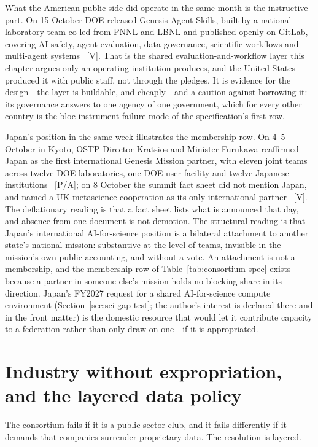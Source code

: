 What the American public side did operate in the same month is the instructive part. On 15 October DOE released Genesis Agent Skills, built by a national-laboratory team co-led from PNNL and LBNL and published openly on GitLab, covering AI safety, agent evaluation, data governance, scientific workflows and multi-agent systems~\cite{sci-genesis-skills} [V]. That is the shared evaluation-and-workflow layer this chapter argues only an operating institution produces, and the United States produced it with public staff, not through the pledges. It is evidence for the design---the layer is buildable, and cheaply---and a caution against borrowing it: its governance answers to one agency of one government, which for every other country is the bloc-instrument failure mode of the specification's first row.

Japan's position in the same week illustrates the membership row. On 4--5 October in Kyoto, OSTP Director Kratsios and Minister Furukawa reaffirmed Japan as the first international Genesis Mission partner, with eleven joint teams across twelve DOE laboratories, one DOE user facility and twelve Japanese institutions~\cite{gov-japan-us-kyoto} [P/A]; on 8 October the summit fact sheet did not mention Japan, and named a UK metascience cooperation as its only international partner~\cite{sci-wh-summit} [V]. The deflationary reading is that a fact sheet lists what is announced that day, and absence from one document is not demotion. The structural reading is that Japan's international AI-for-science position is a bilateral attachment to another state's national mission: substantive at the level of teams, invisible in the mission's own public accounting, and without a vote. An attachment is not a membership, and the membership row of Table~\ref{tab:consortium-spec} exists because a partner in someone else's mission holds no blocking share in its direction. Japan's FY2027 request for a shared AI-for-science compute environment (Section~\ref{sec:sci-gap-test}; the author's interest is declared there and in the front matter) is the domestic resource that would let it contribute capacity to a federation rather than only draw on one---if it is appropriated.

\section{Industry without expropriation, and the layered data policy}

The consortium fails if it is a public-sector club, and it fails differently if it demands that companies surrender proprietary data. The resolution is layered.

